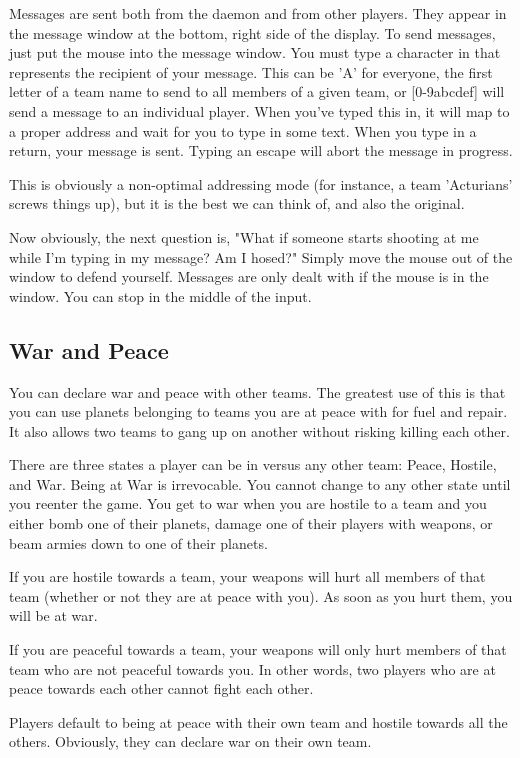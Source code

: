 Messages are sent both from the daemon and from other players.
They appear in the message window at the bottom, right side of the display.
To send messages, just put the mouse into the message window.
You must type a character in that represents the recipient of your
message.  This can be 'A' for everyone,  the first letter of a team name
 to send to all members
of a given team, or [0-9abcdef] will send a message to an individual
player.  When you've typed this in, it will map to a proper address
and wait for you to type in some text.  When you type in a return,
your message is sent.
Typing an escape will abort the message in progress.

This is obviously a non-optimal addressing mode (for instance, a team 'Acturians'
screws things up), but it is the best we can think of, and also the original.

Now obviously, the next question is, "What if someone starts shooting
at me while I'm typing in my message?  Am I hosed?"
Simply move the mouse out of the window to defend yourself.  Messages
are only dealt with if the mouse is in the window.  You can stop
in the middle of the input.


\subsection{War and Peace}

You can declare war and peace with other teams.
The greatest use of this is that you can use planets belonging
to teams you are at peace with for fuel and repair.
It also allows two teams to gang up on another without risking
killing each other.

There are three states a player can be in versus any other team:
Peace, Hostile, and War.  Being at War is irrevocable.  You cannot
change to any other state until you reenter the game.  You get to
war when you are hostile to a team and you either bomb one of their
planets, damage one of their players with weapons, or beam armies
down to one of their planets.

If you are hostile towards a team, your weapons will hurt all members of
that team (whether or not they are at peace with you).  As soon as
you hurt them, you will be at war.

If you are peaceful towards a team, your weapons will only hurt members
of that team who are not peaceful towards you.  In other words, two
players who are at peace towards each other cannot fight each other.

Players default to being at peace with their own team and hostile
towards all the others.  Obviously, they can declare war on their own
team.

